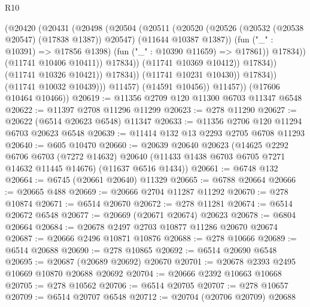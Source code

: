 \begin{lexlean}{R10}
\begin{coremodule}
{{{{{{{{{{{{{{{{{{{{{{{{{{{{{{{{{{{{{{{{{{{{{{{{{{{{{{{{{{{{{{{{{{{{{{{{{{{{{{{{{{{{                                      (@20420
                                        (@20431
                                          (@20498
                                            (@20504
                                              (@20511
                                                (@20520
                                                  (@20526
                                                    (@20532 (@20538 @20547) (@17838 @1387))
                                                    @20547)
                                                  (@11644 @10387 @1387))
                                                (fun ("_" : @10391) => @17856 @1398)
                                                (fun ("_" : @10390 @11659) => @17861))
                                              @17834))
                                          (@11741 @10406 @10411))
                                        @17834))
                                    (@11741 @10369 @10412))
                                  @17834))
                              (@11741 @10326 @10421))
                            @17834))
                        (@11741 @10231 @10430))
                      @17834))
                  (@11741 @10032 @10439)))
              @11457)
            (@14591 @10456))
          @11457))
      (@17606 @10464 @10466))
@20619 := @11356 @2709 @120 @11300 @6703 @11347 @6548
@20622 := @11397 @2708 @11296 @11299
@20623 := @278 @11290
@20627 := @20622 (@6514 @20623 @6548) @11347
@20633 := @11356 @2706 @120 @11294 @6703 @20623 @6548
@20639 := @11414 @132 @13 @2293 @2705 @6708 @11293
@20640 := @605 @10470
@20660 := @20639
    @20640
    @20623
    (@14625
      @2292
      @6706
      @6703
      (@7272 @14632)
      @20640
      (@11433 @1438 @6703 @6705 @7271 @14632 @11445 @14676)
      (@11637 @6516 @1434))
@20661 := @6748 @132
@20664 := @6745 (@20661 @20640) @11329
@20665 := @6788 @20664
@20666 := @20665 @488
@20669 := @20666 @2704 @11287 @11292
@20670 := @278 @10874
@20671 := @6514 @20670
@20672 := @278 @11281
@20674 := @6514 @20672 @6548
@20677 := @20669 (@20671 @20674) @20623
@20678 := @6804 @20664
@20684 := @20678 @2497 @2703 @10877 @11286 @20670 @20674
@20687 := @20666 @2496 @10871 @10876
@20688 := @278 @10666
@20689 := @6514 @20688
@20690 := @278 @10865
@20692 := @6514 @20690 @6548
@20695 := @20687 (@20689 @20692) @20670
@20701 := @20678 @2393 @2495 @10669 @10870 @20688 @20692
@20704 := @20666 @2392 @10663 @10668
@20705 := @278 @10562
@20706 := @6514 @20705
@20707 := @278 @10657
@20709 := @6514 @20707 @6548
@20712 := @20704 (@20706 @20709) @20688
}}}}}}}}}}}}}}}}}}}}}}}}}}}}}}}}}}}}}}}}}}}}}}}}}}}}}}}}}}}}}}}}}}}}}}}}}}}}}}}}}}}}
\end{coremodule}
\end{lexlean}
